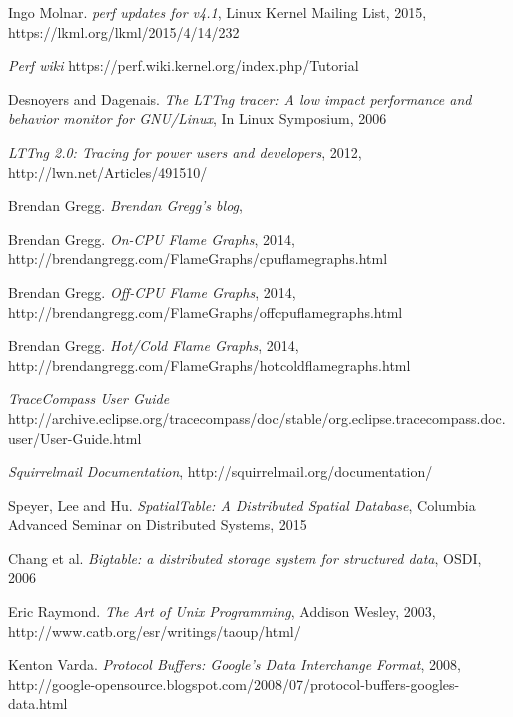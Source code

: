 \documentclass[10pt]{article}
\begin{document}
\raggedright
\begin{thebibliography}{9}

  Ingo Molnar.
  \emph{perf updates for v4.1},
  Linux Kernel Mailing List,
  2015,
  https://lkml.org/lkml/2015/4/14/232

  \emph{Perf wiki}
  https://perf.wiki.kernel.org/index.php/Tutorial

  Desnoyers and Dagenais.
  \emph{The LTTng tracer: A low impact performance and behavior monitor for
  GNU/Linux},
   In Linux Symposium,
   2006

  \emph{LTTng 2.0: Tracing for power users and developers},
  2012,
  http://lwn.net/Articles/491510/

  Brendan Gregg.
  \emph{Brendan Gregg's blog},

  Brendan Gregg.
  \emph{On-CPU Flame Graphs},
   2014,
   http://brendangregg.com/FlameGraphs/cpuflamegraphs.html 

  Brendan Gregg.
  \emph{Off-CPU Flame Graphs},
   2014,
   http://brendangregg.com/FlameGraphs/offcpuflamegraphs.html

  Brendan Gregg.
  \emph{Hot/Cold Flame Graphs},
   2014,
   http://brendangregg.com/FlameGraphs/hotcoldflamegraphs.html

  \emph{TraceCompass User Guide}
  http://archive.eclipse.org/tracecompass/doc/stable/org.eclipse.tracecompass.doc.user/User-Guide.html

  \emph{Squirrelmail Documentation},
  http://squirrelmail.org/documentation/

  Speyer, Lee and Hu.
  \emph{SpatialTable: A Distributed Spatial Database},
  Columbia Advanced Seminar on Distributed Systems,
  2015

  Chang et al.
  \emph{Bigtable: a distributed storage system for structured data},
  OSDI,
  2006

  Eric Raymond.
  \emph{The Art of Unix Programming},
  Addison Wesley,
  2003,
  http://www.catb.org/esr/writings/taoup/html/

  Kenton Varda.
  \emph{Protocol Buffers: Google's Data Interchange Format},
  2008,
  http://google-opensource.blogspot.com/2008/07/protocol-buffers-googles-data.html
\end{thebibliography}
\end{document}
